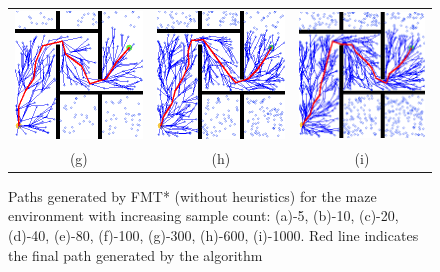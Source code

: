 \documentclass{article}
\begin{document}
\begin{figure}
{\begin{tabular}{ccc}
			\includegraphics[scale=0.45]{fmt_paths/n_samples/6.png} & \includegraphics[scale=0.45]{fmt_paths/n_samples/7.png} & \includegraphics[scale=0.45]{fmt_paths/n_samples/8.png}\\
			(g) & (h) & (i)\\[6pt]
		\end{tabular}
	}
	\caption{Paths generated by FMT* (without heuristics) for the maze environment with increasing sample count: (a)-5, (b)-10, (c)-20, (d)-40, (e)-80, (f)-100, (g)-300, (h)-600, (i)-1000. Red line indicates the final path generated by the algorithm}
	\label{fmt:nsamples}
\end{figure}
\end{document}
